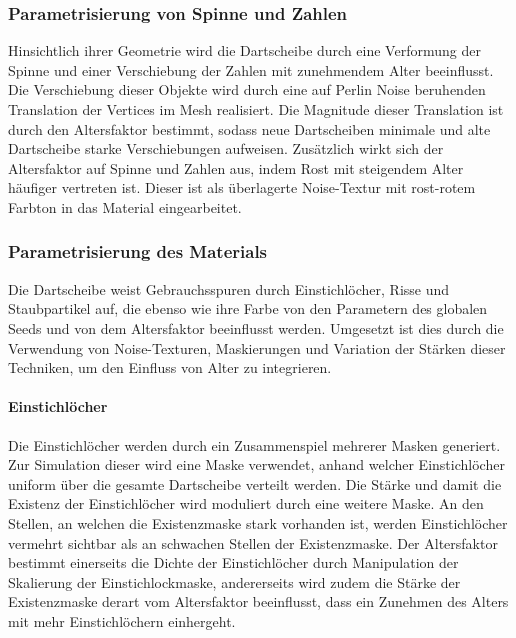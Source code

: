 \subsubsection{Parametrisierung von Spinne und Zahlen}

Hinsichtlich ihrer Geometrie wird die Dartscheibe durch eine Verformung der Spinne und einer Verschiebung der Zahlen mit zunehmendem Alter beeinflusst. Die Verschiebung dieser Objekte wird durch eine auf Perlin Noise beruhenden Translation der Vertices im Mesh realisiert. Die Magnitude dieser Translation ist durch den Altersfaktor bestimmt, sodass neue Dartscheiben minimale und alte Dartscheibe starke Verschiebungen aufweisen. Zusätzlich wirkt sich der Altersfaktor auf Spinne und Zahlen aus, indem Rost mit steigendem Alter häufiger vertreten ist. Dieser ist als überlagerte Noise-Textur mit rost-rotem Farbton in das Material eingearbeitet.

\newpage
\subsubsection{Parametrisierung des Materials}

Die Dartscheibe weist Gebrauchsspuren durch Einstichlöcher, Risse und Staubpartikel auf, die ebenso wie ihre Farbe von den Parametern des globalen Seeds und von dem Altersfaktor beeinflusst werden. Umgesetzt ist dies durch die Verwendung von Noise-Texturen, Maskierungen und Variation der Stärken dieser Techniken, um den Einfluss von Alter zu integrieren.

\paragraph{Einstichlöcher}

Die Einstichlöcher werden durch ein Zusammenspiel mehrerer Masken generiert. Zur Simulation dieser wird eine Maske verwendet, anhand welcher Einstichlöcher uniform über die gesamte Dartscheibe verteilt werden. Die Stärke und damit die Existenz der Einstichlöcher wird moduliert durch eine weitere Maske. An den Stellen, an welchen die Existenzmaske stark vorhanden ist, werden Einstichlöcher vermehrt sichtbar als an schwachen Stellen der Existenzmaske. Der Altersfaktor bestimmt einerseits die Dichte der Einstichlöcher durch Manipulation der Skalierung der Einstichlockmaske, andererseits wird zudem die Stärke der Existenzmaske derart vom Altersfaktor beeinflusst, dass ein Zunehmen des Alters mit mehr Einstichlöchern einhergeht.

